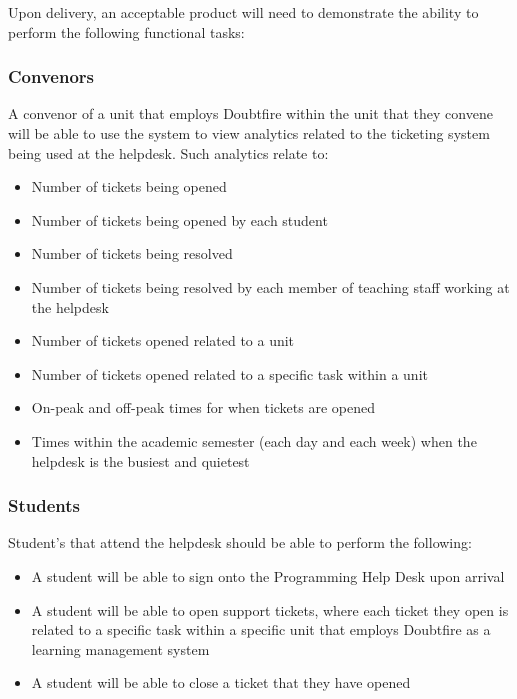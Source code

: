 \documentclass[12pt,a4paper,]{article}
\providecommand{\tightlist}{%
  \setlength{\itemsep}{0pt}\setlength{\parskip}{0pt}}
\begin{document}
Upon delivery, an acceptable product will need to demonstrate the
ability to perform the following functional tasks:

\subsubsection{Convenors}\label{convenors}

A convenor of a unit that employs Doubtfire within the unit that they
convene will be able to use the system to view analytics related to the
ticketing system being used at the helpdesk. Such analytics relate to:

\begin{itemize}
\tightlist
\item
  Number of tickets being opened
\item
  Number of tickets being opened by each student
\item
  Number of tickets being resolved
\item
  Number of tickets being resolved by each member of teaching staff
  working at the helpdesk
\item
  Number of tickets opened related to a unit
\item
  Number of tickets opened related to a specific task within a unit
\item
  On-peak and off-peak times for when tickets are opened
\item
  Times within the academic semester (each day and each week) when the
  helpdesk is the busiest and quietest
\end{itemize}

\subsubsection{Students}\label{students}

Student's that attend the helpdesk should be able to perform the
following:

\begin{itemize}
\tightlist
\item
  A student will be able to sign onto the Programming Help Desk upon
  arrival
\item
  A student will be able to open support tickets, where each ticket they
  open is related to a specific task within a specific unit that employs
  Doubtfire as a learning management system
\item
  A student will be able to close a ticket that they have opened
\end{itemize}
\end{document}
